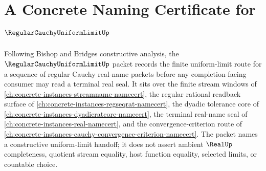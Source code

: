\chapter{A Concrete Naming Certificate for $\RegularCauchyUniformLimitUp$}
\label{ch:concrete-instances-regular-cauchy-uniform-limit-namecert}

Following Bishop and Bridges constructive analysis, the $\RegularCauchyUniformLimitUp$ packet records the finite uniform-limit route for a sequence of regular Cauchy real-name packets before any completion-facing consumer may read a terminal real seal. It sits over the finite stream windows of \autoref{ch:concrete-instances-streamname-namecert}, the regular rational readback surface of \autoref{ch:concrete-instances-regseqrat-namecert}, the dyadic tolerance core of \autoref{ch:concrete-instances-dyadicratcore-namecert}, the terminal real-name seal of \autoref{ch:concrete-instances-real-namecert}, and the convergence-criterion route of \autoref{ch:concrete-instances-cauchy-convergence-criterion-namecert}. The packet names a constructive uniform-limit handoff; it does not assert ambient $\RealUp$ completeness, quotient stream equality, host function equality, selected limits, or countable choice.

